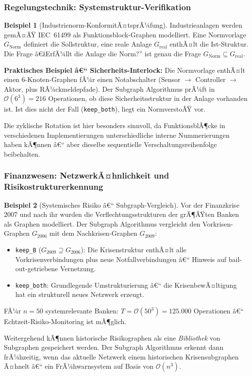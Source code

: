 ﻿\documentclass[12pt,a4paper,twoside]{article}
\theoremstyle{definition}
\newtheorem{beispiel}{Beispiel}[section]
\theoremstyle{plain}
\theoremstyle{remark}
\begin{document}
\subsubsection{Regelungstechnik: Systemstruktur-Verifikation}

\begin{beispiel}[Industrienorm-KonformitÃ¤tsprÃ¼fung]
Industrieanlagen werden gemÃ¤ÃŸ IEC~61499 als Funktionsblock-Graphen
modelliert.  Eine Normvorlage $G_{\text{Norm}}$ definiert die
Sollstruktur, eine reale Anlage $G_{\text{real}}$ enthÃ¤lt
die Ist-Struktur.  Die Frage â€žErfÃ¼llt die Anlage die Norm?''
ist genau die Frage $G_{\text{Norm}} \subseteq G_{\text{real}}$.

\textbf{Praktisches Beispiel â€“ Sicherheits-Interlock:}
Die Normvorlage enthÃ¤lt einen 6-Knoten-Graphen fÃ¼r einen
Notabschalter (Sensor $\to$ Controller $\to$ Aktor,
plus RÃ¼ckmeldepfade).  Der Subgraph Algorithmus prÃ¼ft
in $\mathcal{O}(6^3) = 216$ Operationen, ob diese
Sicherheitsstruktur in der Anlage vorhanden ist.
Ist dies nicht der Fall (\texttt{keep\_both}),
liegt ein NormverstoÃŸ vor.

Die zyklische Rotation ist hier besonders sinnvoll,
da FunktionsblÃ¶cke in verschiedenen Implementierungen
unterschiedliche interne Nummerierungen haben kÃ¶nnen â€“
aber dieselbe sequentielle Verschaltungsreihenfolge
beibehalten.
\end{beispiel}

\subsubsection{Finanzwesen: NetzwerkÃ¤hnlichkeit und\\
               Risikostrukturerkennung}

\begin{beispiel}[Systemisches Risiko â€“ Subgraph-Vergleich]
Vor der Finanzkrise 2007 und nach ihr wurden die
Verflechtungsstrukturen der grÃ¶ÃŸten Banken als
Graphen modelliert.  Der Subgraph Algorithmus vergleicht
den Vorkrisen-Graphen $G_{2006}$ mit dem
Nachkrisen-Graphen $G_{2009}$:
\begin{itemize}
  \item \texttt{keep\_B} ($G_{2009} \supseteq G_{2006}$):
        Die Krisenstruktur enthÃ¤lt alle Vorkrisenverbindungen
        plus neue Notfallverbindungen â€“ Hinweis auf
        bail-out-getriebene Vernetzung.
  \item \texttt{keep\_both}: Grundlegende Umstrukturierung â€“
        die KrisenbewÃ¤ltigung hat ein strukturell neues
        Netzwerk erzeugt.
\end{itemize}
FÃ¼r $n = 50$ systemrelevante Banken:
$T = \mathcal{O}(50^3) = 125.000$ Operationen â€“
Echtzeit-Risiko-Monitoring ist mÃ¶glich.

Weitergehend kÃ¶nnen historische Risikographen als
eine \emph{Bibliothek} von Subgraphen gespeichert werden.
Der Subgraph Algorithmus erkennt dann frÃ¼hzeitig,
wenn das aktuelle Netzwerk einem historischen
Krisensubgraphen Ã¤hnelt â€“ ein
FrÃ¼hwarnsystem auf Basis von $\mathcal{O}(n^3)$.
\end{beispiel}
\end{document}
